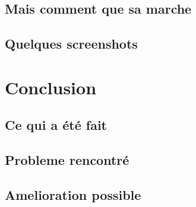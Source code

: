 \documentclass[a4paper,10pt]{report}
\begin{document}
    \section{Mais comment que sa marche}
    \section{Quelques screenshots}

\chapter{Conclusion}
  \section{Ce qui a été fait}
  \section{Probleme rencontré}
  \section{Amelioration possible}
  
\end{document}
